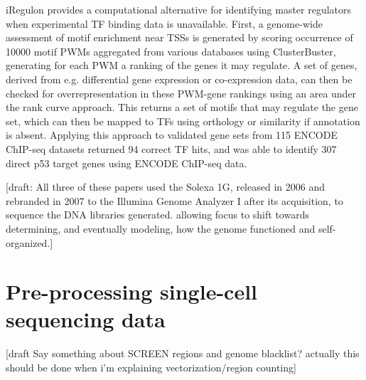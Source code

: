iRegulon provides a computational alternative for identifying master regulators when experimental TF binding data is unavailable. First, a genome-wide assessment of motif enrichment near TSSs is generated by scoring occurrence of \num{10000} motif PWMs aggregated from various databases using ClusterBuster, generating for each PWM a ranking of the genes it may regulate. A set of genes, derived from e.g. differential gene expression or co-expression data, can then be checked for overrepresentation in these PWM-gene rankings using an area under the rank curve approach. This returns a set of motifs that may regulate the gene set, which can then be mapped to TFs using orthology or similarity if annotation is absent. Applying this approach to validated gene sets from 115 ENCODE ChIP-seq datasets returned 94 correct TF hits, and was able to identify 307 direct p53 target genes using ENCODE ChIP-seq data.

	[draft: All three of these papers used the Solexa 1G, released in 2006 and rebranded in 2007 to the Illumina Genome Analyzer I after its acquisition, to sequence the DNA libraries generated. allowing focus to shift towards determining, and eventually modeling, how the genome functioned and self-organized.]


\section{Pre-processing single-cell sequencing data}
 [draft Say something about SCREEN regions and genome blacklist? actually this should be done when i'm explaining vectorization/region counting]

